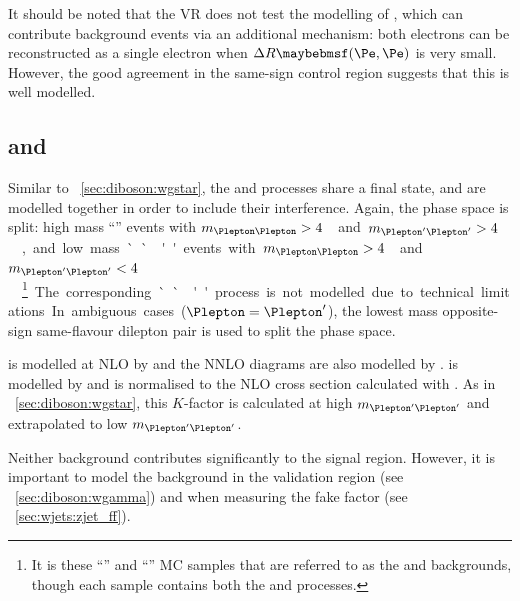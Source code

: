 It should be noted that the \Wgstar VR does not test the modelling of 
\HepProcess{\Wgstar \HepTo \Plepton\Pnu\Pe\Pe}, which can contribute background events via 
an additional mechanism: both electrons can be reconstructed as a single electron when 
$\Delta R\parenths{\Pe,\Pe}$ is very small. However, the good agreement in the same-sign 
control region suggests that this is well modelled.



\subsection{\ZZ and \Zgstar}
\label{sec:diboson:zz}

Similar to \Section~\ref{sec:diboson:wgstar}, the \ZZ and \Zgstar processes share a 
 final state, and are modelled together in 
order to include their interference. Again, the phase space is split: high mass 
``\ZZ'' events with \unit{$m_{\HepProcess{\Plepton\Plepton}} > 4$}{\GeV} and 
\unit{$m_{\HepProcess{\Plepton'\Plepton'}} > 4$}{\GeV}, and low mass ``\Zgstar'' events 
with \unit{$m_{\HepProcess{\Plepton\Plepton}} > 4$}{\GeV} and 
\unit{$m_{\HepProcess{\Plepton'\Plepton'}} < 4$}{\GeV}.\footnote{
	It is these ``\ZZ'' and ``\Zgstar''	MC samples that are referred to as the \ZZ and 
	\Zgstar backgrounds, though each sample contains both the \ZZ and \Zgstar processes.
}
The corresponding ``\HepProcess{\Pgammastar\Pgammastar}'' process is not modelled due to 
technical limitations. In ambiguous cases ($\Plepton = \Plepton'$), the lowest mass 
opposite-sign same-flavour dilepton pair is used to split the phase space.

\ZZ is modelled at NLO by  and the NNLO \ggZZ diagrams are 
also modelled by \meps{\ggtozz}{\fherwig}. \Zgstar is modelled by \sherpa and is normalised 
to the NLO cross section calculated with \mcfm. As in \Section~\ref{sec:diboson:wgstar}, 
this $K$-factor is calculated at high $m_{\HepProcess{\Plepton'\Plepton'}}$ and 
extrapolated to low $m_{\HepProcess{\Plepton'\Plepton'}}$.

Neither background contributes significantly to the signal region. However, it is important 
to model the \Zgstar background in the \Zgamma validation region (see 
\Section~\ref{sec:diboson:wgamma}) and when measuring the \Zjets fake factor (see 
\Section~\ref{sec:wjets:zjet_ff}).

